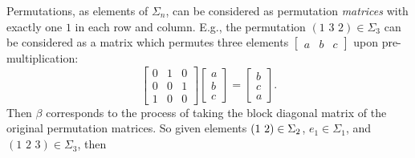 \begin{remark}\label{rem:perm_matrices}
Permutations, as elements of $\Sigma_n$, can be considered as permutation \emph{matrices} with exactly one $1$ in each row and column. E.g., the permutation $(1 \,\, 3 \,\, 2) \in \Sigma_3$ can be considered as a matrix which permutes three elements $\begin{bmatrix} a & b & c \end{bmatrix}$ upon pre-multiplication:
  \[
  \begin{bmatrix}
  0 & 1 & 0 \\
  0 & 0 & 1 \\
  1 & 0 & 0
  \end{bmatrix}
  \begin{bmatrix}
  a \\ b \\ c
  \end{bmatrix}
  =
  \begin{bmatrix}
  b \\ c \\ a
  \end{bmatrix}.
  \]
Then $\beta$ corresponds to the process of taking the block diagonal matrix of the original permutation matrices. So given elements $( 1 \, \, 2 ) \in \Sigma_2$, $e_1 \in \Sigma_1$, and $(1 \,\, 2 \,\, 3) \in \Sigma_3$, then

\end{remark}
